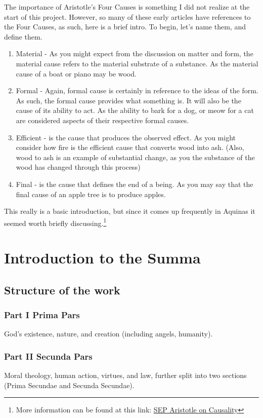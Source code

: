 \documentclass{ucetd}
\begin{document}
The importance of Aristotle's Four Causes is something I did not realize at the start of this project. However, so many of these early articles have references to the Four Causes, as such, here is a brief intro. To begin, let's name them, and define them.
\begin{enumerate}
    \item Material - As you might expect from the discussion on matter and form, the material cause refers to the material substrate of a substance. As the material cause of a boat or piano may be wood. 
    \item Formal - Again, formal cause is certainly in reference to the ideas of the form. As such, the formal cause provides what something is. It will also be the cause of its ability to act. As the ability to bark for a dog, or meow for a cat are considered aspects of their respective formal causes.
    \item Efficient - is the cause that produces the observed effect. As you might consider how fire is the efficient cause that converts wood into ash. (Also, wood to ash is an example of substantial change, as you the substance of the wood has changed through this process)
    \item Final - is the cause that defines the end of a being. As you may say that the final cause of an apple tree is to produce apples.
\end{enumerate}
This really is a basic introduction, but since it comes up frequently in Aquinas it seemed worth briefly discussing.\footnote{More information can be found at this link: \href{https://plato.stanford.edu/entries/aristotle-causality/}{SEP Aristotle on Causality}}

\clearpage

\chapter{Introduction to the Summa}
\section{Structure of the work}
\subsection*{Part I Prima Pars} God's existence, nature, and creation (including angels, humanity).

\subsection*{Part II Secunda Pars} Moral theology, human action, virtues, and law, further split into two sections (Prima Secundae and Secunda Secundae).
\end{document}
